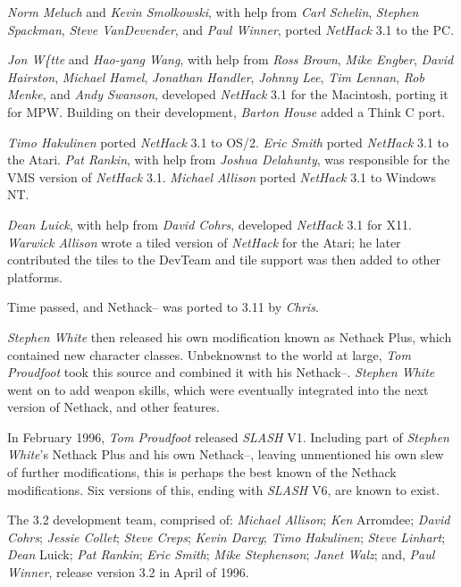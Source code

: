 {\it Norm Meluch\/} and {\it Kevin Smolkowski}, with help from
{\it Carl Schelin}, {\it Stephen Spackman}, {\it Steve VanDevender},
and {\it Paul Winner}, ported {\it NetHack\/} 3.1 to the PC.

{\it Jon W\{tte\/} and {\it Hao-yang Wang}, with help from {\it Ross Brown},
{\it Mike Engber}, {\it David Hairston}, {\it Michael Hamel},
{\it Jonathan Handler}, {\it Johnny Lee}, {\it Tim Lennan}, {\it Rob Menke},
and {\it Andy Swanson}, developed {\it NetHack\/} 3.1 for the Macintosh,
porting it for MPW.  Building on their development, {\it Barton House\/}
added a Think C port.

{\it Timo Hakulinen\/} ported {\it NetHack\/} 3.1 to OS/2.  {\it Eric Smith\/}
ported {\it NetHack\/} 3.1 to the Atari.  {\it Pat Rankin}, with help from
{\it Joshua Delahunty}, was responsible for the VMS version of {\it NetHack\/} 3.1.
{\it Michael Allison\/} ported {\it NetHack\/} 3.1 to Windows NT.

{\it Dean Luick}, with help from {\it David Cohrs}, developed {\it NetHack\/}
3.1 for X11.
{\it Warwick Allison\/} wrote a tiled version of {\it NetHack\/} for the Atari;
he later contributed the tiles to the DevTeam and tile support was
then added to other platforms.

Time passed,  and Nethack-- was ported to 3.11 by {\it Chris}.

{\it Stephen White\/} then released his own modification known as
Nethack Plus,  which contained new character classes.  Unbeknownst
to the world at large,  {\it Tom Proudfoot\/} took this source and
combined it with his Nethack--.  {\it Stephen White\/} went on to add
weapon skills,  which were eventually integrated into the next version
of Nethack,  and other features.

In February 1996,  {\it Tom Proudfoot\/} released {\it SLASH\/} V1.  Including
part of {\it Stephen White\/}'s Nethack Plus and his own Nethack--,  leaving
unmentioned his own slew of further modifications,  this is perhaps
the best known of the Nethack modifications.  Six versions of this,  ending
with {\it SLASH\/} V6,  are known to exist.

The 3.2 development team, comprised of: {\it Michael Allison\/}; {\it Ken}
Arromdee; {\it David Cohrs\/}; {\it Jessie Collet\/}; {\it Steve Creps\/};
{\it Kevin Darcy\/}; {\it Timo Hakulinen\/}; {\it Steve Linhart\/}; {\it Dean}
Luick; {\it Pat Rankin\/}; {\it Eric Smith\/}; {\it Mike Stephenson\/};
{\it Janet Walz\/}; and, {\it Paul Winner}, release version 3.2 in April of
1996.

